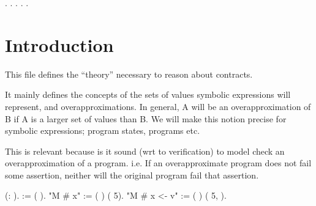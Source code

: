 \documentclass[12pt]{report}
\begin{document}

\begin{coqdoccode}
\coqdocnoindent
{}     .\coqdoceol
\coqdocindent{5.00em}
  .\coqdoceol
\coqdocnoindent
{} .\coqdoceol
\coqdocemptyline
\coqdocnoindent
{}  .\coqdoceol
\coqdocnoindent
{}  .\coqdoceol
\coqdocemptyline
\end{coqdoccode}
\section{Introduction}

 This file defines the ``theory'' necessary to reason about contracts.


    It mainly defines the concepts of the sets of values symbolic
    expressions will represent, and overapproximations. In general, A
    will be an overapproximation of B if A is a larger set of values
    than B. We will make this notion precise for symbolic expressions;
    program states, programs etc.


    This is relevant because is it sound (wrt to verification) to
    model check an overapproximation of a program. i.e. If an
    overapproximate program does not fail some assertion,
    neither will the original program fail that assertion.
    
\begin{coqdoccode}
\coqdocemptyline
\coqdocnoindent
{}  (: ).\coqdoceol
\coqdocindent{1.00em}
   := ( ).\coqdoceol
\coqdocindent{1.00em}
  "M \# x"      := (  ) (  5).\coqdoceol
\coqdocindent{1.00em}
  "M \# x <- v" := (   ) (  5,    ).\coqdoceol
\coqdocemptyline
\end{coqdoccode}
\end{document}
